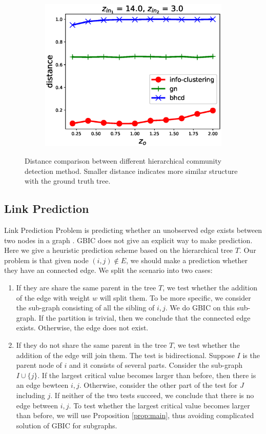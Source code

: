\begin{figure}
\begin{subfigure}{0.33\textwidth}
		\includegraphics[width=\textwidth]{pic/z_o.eps}
		\caption{}
	\end{subfigure}
	\caption{Distance comparison between different hierarchical community detection method. Smaller distance indicates more similar structure with the ground truth tree.}\label{fig:cdr}	
\end{figure}
\subsection{Link Prediction}
Link Prediction Problem is predicting whether an unobserved edge exists between two nodes in a graph \citep{liben2007link}.  GBIC does not give an explicit way to make prediction. Here we give a heuristic prediction scheme based on the hierarchical tree $T$. Our problem is that given node $(i,j) \not\in E$, we should make a prediction whether they have an connected edge. We split the scenario 
into two cases:
\begin{enumerate}
\item If they are share the same parent in the tree $T$, we test whether the addition of the edge with weight $w$ will split them. To be more specific, we consider the sub-graph consisting of all the sibling of $i,j$. We do GBIC on this sub-graph. If the partition is trivial, then we conclude that the connected edge exists. Otherwise, the edge does not exist.

\item If they do not share the same parent in the tree $T$, we test whether the addition of the edge will join them. The test is bidirectional. Suppose $I$ is the parent node of $i$ and it consists of several parts. Consider the sub-graph $I \cup \{j\}$. If the largest critical value becomes larger than before, then there is an edge bewteen $i,j$. Otherwise, consider the other part of the test for $J$ including $j$. If neither of the two tests succeed, we conclude that there is no edge between $i,j$. To test whether the largest critical value becomes larger than before, we will use Proposition \ref{prop:main},  thus avoiding complicated solution of GBIC for subgraphs.
\end{enumerate}

